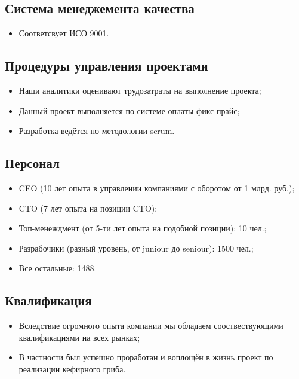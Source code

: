 \documentclass[a4paper,8pt]{article}
\begin{document}
\subsection{Система менеджемента качества}


    \begin{itemize}
        \item Соответсвует ИСО 9001.
    \end{itemize}


\subsection{Процедуры управления проектами}


    \begin{itemize}
        \item Наши аналитики оценивают трудозатраты на выполнение проекта;
        \item Данный проект выполняется по системе оплаты фикс прайс;
        \item Разработка ведётся по методологии scrum.
    \end{itemize}



\subsection{Персонал}


    \begin{itemize}
        \item CEO (10 лет опыта в управлении компаниями с оборотом от 1 млрд. руб.);
        \item CTO (7 лет опыта на позиции CTO);
        \item Топ-менеждмент (от 5-ти лет опыта на подобной позиции): 10 чел.;
        \item Разрабочики (разный уровень, от juniour до seniour): 1500 чел.;
        \item Все остальные: 1488.
    \end{itemize}



\subsection{Квалификация}


    \begin{itemize}
        \item Вследствие огромного опыта компании мы обладаем сооствествующими квалификациями на всех рынках;
        \item В частности был успешно проработан и воплощён в жизнь проект по реализации кефирного гриба.
    \end{itemize}
\end{document}
